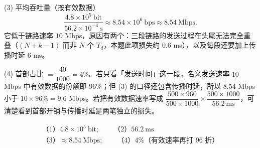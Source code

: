 \begin{enumerate}[start=7]
(3) 平均吞吐量（按有效数据）
\[
\frac{4.8\times10^{5}\ \text{bit}}{56.2\times10^{-3}\ \text{s}}\approx8.54\times10^{6}\ \text{bps}\approx8.54\ \text{Mbps}.
\]
它低于链路速率 $10$ Mbps，原因有两个：三段链路的发送过程在头尾无法完全重叠（$(N+k-1)$ 而非 $N$ 个 $T_d$，本题此项损失约 $0.6$ ms），以及每段还要加上传播时延 $6$ ms。

(4) 首部占比 $=\dfrac{40}{1000}=4\%$。若只看「发送时间」这一段，名义发送速率 $10$ Mbps 中有效数据的份额即 $96\%$；但 (3) 的口径还包含传播时延，所以 $8.54$ Mbps 小于 $10\times96\%=9.6$ Mbps。若把有效数据速率写成 $\dfrac{500\times960}{500\times1000}\times\dfrac{500\times1000}{56.2\ \text{ms}}$，可清楚看到首部开销与传播时延是两笔独立的损失。

\[
\boxed{\begin{array}{l}
\text{（1）}4.8\times10^{5}\ \text{bit};\qquad \text{（2）}56.2\ \text{ms}\\[3pt]
\text{（3）}\approx8.54\ \text{Mbps};\qquad \text{（4）}4\%\text{（有效速率再打 }96\text{ 折）}
\end{array}}
\]
\else \answerarea[12] \fi

\end{enumerate}
